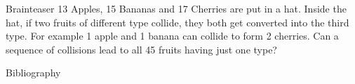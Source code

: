 \documentclass[aspectratio=169, handout]{beamer}
\begin{document}

\begin{frame}{Brainteaser}
    13 Apples, 15 Bananas and 17 Cherries are put in a hat. Inside the hat, if two fruits of different type collide, they both get converted into the third type. For example 1 apple and 1 banana can collide to form 2 cherries. Can a sequence of collisions lead to all 45 fruits having just one type?
\end{frame}



\begin{frame}[allowframebreaks]{Bibliography}
    \tiny
    
    
\end{frame}
\end{document}
